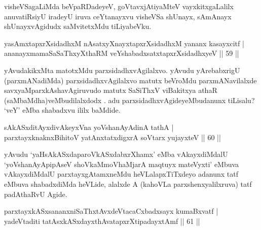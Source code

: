 \begin{artha}
visheVSagaLiMda beVpaRDadeyeV, goVtavxjAtiyaMteV vayxkitxgaLalilx anuvatiRsiyU iradeyU iruva ceYtanayxvu visheVSa shUnayx, sAmAnayx shUnayxvAgidudx saMvitetxMdu tiLiyabeVku.
\end{artha}


\begin{shl}
yasAmxtapxrXsidadhxM nAsatxyXnayxtapxrXsidadhxM yananx kasayxcitf |\\
ananayxmamaSaSaThxyXthaRM veYshabadxsatxtapxrXsidadhxyeV \hfill || 59 ||
\end{shl}

\begin{artha}
yAvudakikxMta matotxMdu parxsidadhxvAgilalxvo. yAvudu yArebabxrigU  (parxmANadiMda) parxsidadhxvAgilalxvo matutx beVroMdu parxmANavilalxde savxyaMparxkAshavAgiruvudo matutx SaSiThxV viBakitxya athaR (saMbaMdha)veMbudilalxdodx . adu parxsidadhxvAgideyeMbudanunx tiLisalu? `veY' eMba shabadxvu ililx baMdide.
\end{artha}


\begin{shl}
sAkASxditAyxdivAkeyxVna yoV\s shanAyAdinA tathA |\\
parxtayxknaknxBihitoV yatAnxtatxdigxrA soV\s tarx yujayxteV \hfill || 60 ||
\end{shl}

\begin{artha}
yAvudu `yaHsAkASxdaparoVkASxdabxrXhamx' eMba vAkayxdiMdalU `yoV\s shanAyApipAseV shoVkaMmoVhaMjarA maqtuyx mateVyxti' eMbuva vAkayxdiMdalU parxtayxgAtamxneMdu heVLalapxTiTxdeyo adanunx tatf eMbuva shabadxdiMda heVLide, alalxde A (kahoVLa parxshenxyalilxruva) tatf padAthaRvU Agide.
\end{artha}


\begin{shl}
parxtayxkASxsananxniSaThxtAvxdeVtacaCxbadxsayx kumaBxvatf |\\
\footnotemark[1]yadeVtaditi tatAsxkASxdayxthAvatapxrXtipadayxtAmf \hfill || 61 ||
\end{shl}

